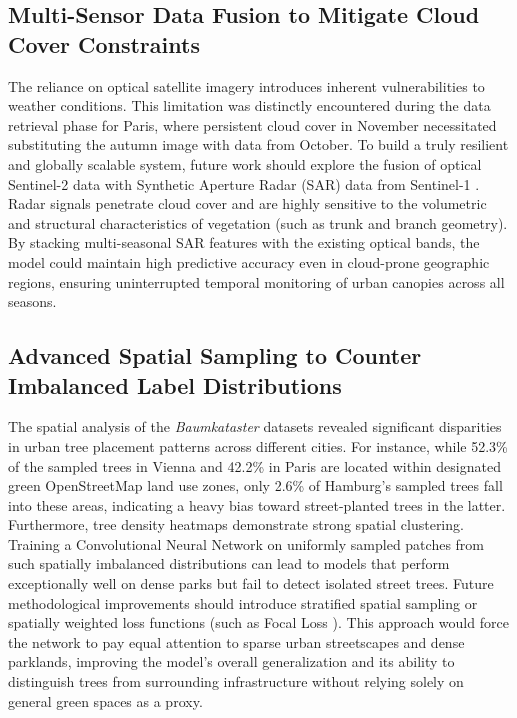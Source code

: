 \subsection{Multi-Sensor Data Fusion to Mitigate Cloud Cover Constraints}
The reliance on optical satellite imagery introduces inherent vulnerabilities to weather conditions. This limitation was distinctly encountered during the data retrieval phase for Paris, where persistent cloud cover in November necessitated substituting the autumn image with data from October. To build a truly resilient and globally scalable system, future work should explore the fusion of optical Sentinel-2 data with Synthetic Aperture Radar (SAR) data from Sentinel-1 \cite{torres2012sentinel}. Radar signals penetrate cloud cover and are highly sensitive to the volumetric and structural characteristics of vegetation (such as trunk and branch geometry). By stacking multi-seasonal SAR features with the existing optical bands, the model could maintain high predictive accuracy even in cloud-prone geographic regions, ensuring uninterrupted temporal monitoring of urban canopies across all seasons.

\subsection{Advanced Spatial Sampling to Counter Imbalanced Label Distributions}
The spatial analysis of the \textit{Baumkataster} datasets revealed significant disparities in urban tree placement patterns across different cities. For instance, while 52.3\% of the sampled trees in Vienna and 42.2\% in Paris are located within designated green OpenStreetMap land use zones, only 2.6\% of Hamburg's sampled trees fall into these areas, indicating a heavy bias toward street-planted trees in the latter. Furthermore, tree density heatmaps demonstrate strong spatial clustering. Training a Convolutional Neural Network on uniformly sampled patches from such spatially imbalanced distributions can lead to models that perform exceptionally well on dense parks but fail to detect isolated street trees. Future methodological improvements should introduce stratified spatial sampling or spatially weighted loss functions (such as Focal Loss \cite{lin2017focal}). This approach would force the network to pay equal attention to sparse urban streetscapes and dense parklands, improving the model's overall generalization and its ability to distinguish trees from surrounding infrastructure without relying solely on general green spaces as a proxy.

